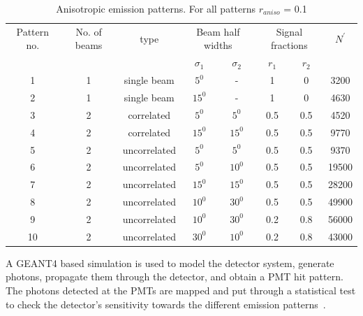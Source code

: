 \begin{table}[h]
  \centering
  \label{tab:AnisoPattern}
  \begin{tabular}{|c |c |c|cc|cc|c|}
  \hline
  Pattern no. & No. of beams & type & \multicolumn{2}{c|}{Beam half widths}& \multicolumn{2}{c|}{Signal fractions} & $N^{'}$ \\
  &              &      &  $\sigma_1$ & $\sigma_2$   &  $r_1$ & $r_2$ &   \\
  \hline
  1 & 1 & single beam & $5^{0}$ & - & 1 & 0 & 3200\\
   2 & 1 & single beam & $15^{0}$ & - & 1 & 0 & 4630\\
   3 & 2 & correlated & $5^{0}$ & $5^{0}$ & 0.5 & 0.5 &  4520  \\
   4 & 2 & correlated & $15^{0}$ & $15^{0}$ & 0.5 & 0.5 & 9770  \\
   5 & 2 & uncorrelated & $5^{0}$ & $5^{0}$ & 0.5 & 0.5 & 9370\\
   6 & 2 & uncorrelated & $5^{0}$ & $10^{0}$ & 0.5 & 0.5 & 19500\\
   7 & 2 & uncorrelated & $15^{0}$ & $15^{0}$ & 0.5 & 0.5 & 28200\\
   8 & 2 & uncorrelated & $10^{0}$ & $30^{0}$ & 0.5 & 0.5 & 49900\\
   9 & 2 & uncorrelated & $10^{0}$ & $30^{0}$ & 0.2 & 0.8 & 56000\\
    10 & 2 & uncorrelated & $30^{0}$ & $10^{0}$ & 0.2 & 0.8 & 43000\\
  \hline
 \end{tabular}
   \caption{Anisotropic emission patterns. For all patterns $r_{aniso}$ = 0.1}

\end{table} 
 
 

A GEANT4 based simulation is used to model the detector system, generate photons, propagate them through the detector, and obtain a PMT hit pattern. The photons detected at the 
PMTs are mapped and put through a statistical test to check the detector's sensitivity towards the different emission patterns~\cite{MaorThesis}.

